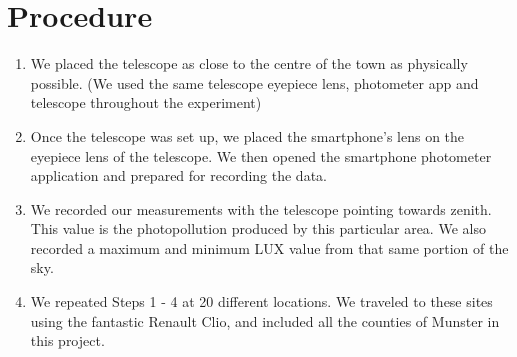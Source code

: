 \section{Procedure}  
\begin{enumerate}
\subsection{Data Collection}
\item We placed the telescope as close to the centre of the town as physically possible. (We used the same telescope eyepiece lens, photometer app and telescope throughout the experiment)
\item Once the telescope was set up, we placed the smartphone’s lens on the eyepiece lens of the telescope. We then opened the smartphone photometer application and prepared for recording the data.
\item We recorded our measurements with the telescope pointing towards zenith. This value is the photopollution produced by this particular area. We also recorded a maximum and minimum LUX value from that same portion of the sky.
\item We repeated Steps 1 - 4 at 20 different locations. We traveled to these sites using the fantastic Renault Clio, and included all the counties of Munster in this project.

\end{enumerate}
